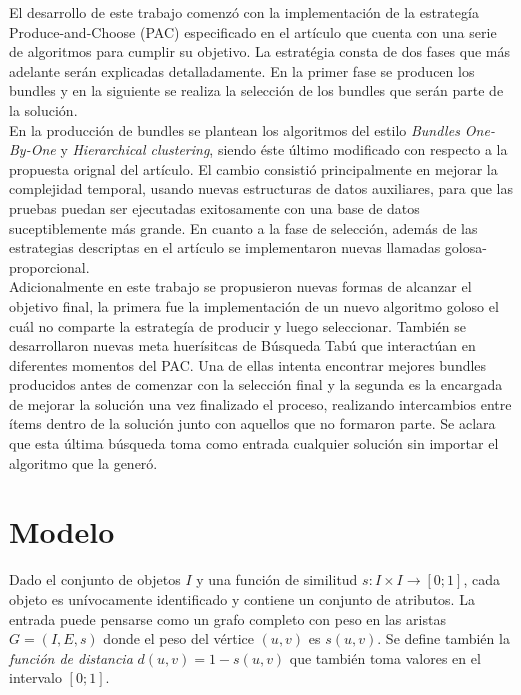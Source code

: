 El desarrollo de este trabajo comenzó con la implementación de la estrategía Produce-and-Choose (PAC) especificado en el artículo \cite{compositeRetrival} que cuenta con una serie de algoritmos para cumplir su objetivo. La estratégia consta de dos fases que más adelante serán explicadas detalladamente. En la primer fase se producen los bundles y en la siguiente se realiza la selección de los bundles que serán parte de la solución.\\
En la producción de bundles se plantean los algoritmos del estilo \textit{Bundles One-By-One} y \textit{Hierarchical clustering}, siendo éste último modificado con respecto a la propuesta orignal del artículo. El cambio consistió principalmente en mejorar la complejidad temporal, usando nuevas estructuras de datos auxiliares, para que las pruebas puedan ser ejecutadas exitosamente con una base de datos suceptiblemente más grande. En cuanto a la fase de selección, además de las estrategias descriptas en el artículo se implementaron nuevas llamadas golosa-proporcional.\\
Adicionalmente en este trabajo se propusieron nuevas formas de alcanzar el objetivo final, la primera fue la implementación de un nuevo algoritmo goloso el cuál no comparte la estrategía de producir y luego seleccionar. También se desarrollaron nuevas meta huerísitcas de Búsqueda Tabú que interactúan en diferentes momentos del PAC. Una de ellas intenta encontrar mejores bundles producidos antes de comenzar con la selección final y la segunda es la encargada de mejorar la solución una vez finalizado el proceso, realizando intercambios entre ítems dentro de la solución junto con aquellos que no formaron parte. Se aclara que esta última búsqueda toma como entrada cualquier solución sin importar el algoritmo que la generó.
\section{Modelo}
Dado el conjunto de objetos $I$ y una función de similitud $ s: I \times I \rightarrow [0;1]$, cada objeto es unívocamente identificado y contiene un conjunto de atributos. La entrada puede pensarse como un grafo completo con peso en las aristas $G=(I,E,s)$ donde el peso del vértice $(u,v)$ es $s(u,v)$. Se define también la \textit{función de distancia} $d(u,v) = 1 - s(u,v)$ que también toma valores en el intervalo $[0;1]$.

